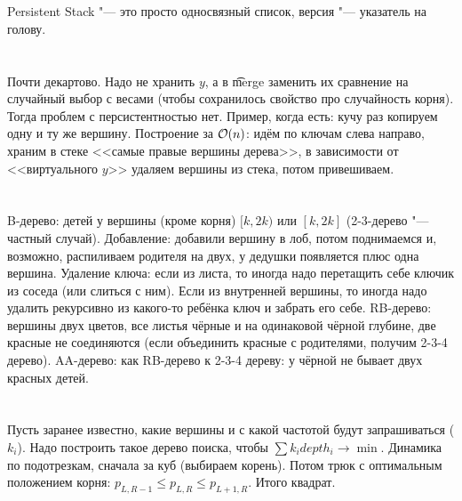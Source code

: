 \section{} %
Persistent Stack "--- это просто односвязный список, версия "--- указатель на голову.
\TODO

\section{} %
Почти декартово.
Надо не хранить $y$, а в \t{merge} заменить их сравнение на случайный выбор с весами
(чтобы сохранилось свойство про случайность корня).
Тогда проблем с персистентностью нет.
Пример, когда есть: кучу раз копируем одну и ту же вершину.
Построение за $\mathcal{O}(n)$: идём по ключам слева направо, храним в стеке <<самые правые вершины дерева>>,
в зависимости от <<виртуального $y$>> удаляем вершины из стека, потом привешиваем.

\section{} %
B-дерево: детей у вершины (кроме корня) $[k, 2k)$ или $[k,2k]$ (2-3-дерево "--- частный случай).
Добавление: добавили вершину в лоб, потом поднимаемся и, возможно, распиливаем родителя на двух,
у дедушки появляется плюс одна вершина.
Удаление ключа: если из листа, то иногда надо перетащить себе ключик из соседа (или слиться с ним).
Если из внутренней вершины, то иногда надо удалить рекурсивно из какого-то ребёнка ключ и забрать его себе.
RB-дерево: вершины двух цветов, все листья чёрные и на одинаковой чёрной глубине,
две красные не соединяются (если объединить красные с родителями, получим 2-3-4 дерево).
AA-дерево: как RB-дерево к 2-3-4 дереву: у чёрной не бывает двух красных детей.

\section{} %
Пусть заранее известно, какие вершины и с какой частотой будут запрашиваться ($k_i$).
Надо построить такое дерево поиска, чтобы $\sum k_i depth_i \to \min$.
Динамика по подотрезкам, сначала за куб (выбираем корень).
Потом трюк с оптимальным положением корня: $p_{L,R-1} \le p_{L,R} \le p_{L+1,R}$.
Итого квадрат.
